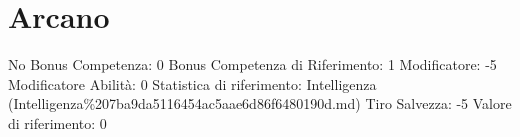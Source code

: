 \section{Arcano}\label{arcano}

\begin{description}
\tightlist
\item[Tags: ABI]
No Bonus Competenza: 0 Bonus Competenza di Riferimento: 1 Modificatore:
-5 Modificatore Abilità: 0 Statistica di riferimento: Intelligenza
(Intelligenza\%207ba9da5116454ac5aae6d86f6480190d.md) Tiro Salvezza: -5
Valore di riferimento: 0
\end{description}
